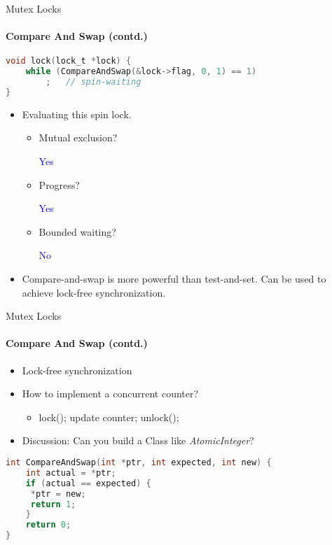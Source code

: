\documentclass[10pt]{beamer}
\begin{document}
\begin{frame}[fragile]{Mutex Locks}
\framesubtitle{Compare And Swap (contd.)}
\begin{lstlisting}[language=C]
void lock(lock_t *lock) {
	while (CompareAndSwap(&lock->flag, 0, 1) == 1)
		;	// spin-waiting
}
\end{lstlisting}
\begin{itemize}
 
\item Evaluating this spin lock.
\begin{itemize}
\item Mutual exclusion?
\begin{uncoverenv}
\textcolor{blue}{Yes}
\end{uncoverenv}
\item Progress?
\begin{uncoverenv}
\textcolor{blue}{Yes}
\end{uncoverenv}
\item Bounded waiting?
\begin{uncoverenv}
\textcolor{blue}{No}
\end{uncoverenv}
\end{itemize}
\item Compare-and-swap is more powerful than test-and-set. Can be used to achieve lock-free synchronization.
\end{itemize}
\end{frame}

\begin{frame}[fragile]{Mutex Locks}
\framesubtitle{Compare And Swap (contd.)}
 
\begin{itemize}
\item Lock-free synchronization 
\item How to implement a concurrent counter?
\begin{itemize}
\item lock(); update counter; unlock();
\end{itemize}
\item \alert{Discussion: Can you build a Class like \emph{AtomicInteger}?}
\end{itemize}
\begin{lstlisting}[language=C]
int CompareAndSwap(int *ptr, int expected, int new) {
	int actual = *ptr;
	if (actual == expected) {
	 *ptr = new;
	 return 1;
	}
	return 0;
}
\end{lstlisting}
\end{frame}
\end{document}

